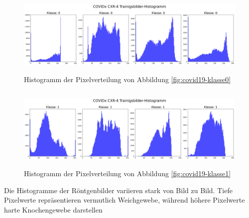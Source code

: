 \begin{figure}[ht]
    \centering
    \includegraphics[width=\linewidth, height=4cm]{01-images/03-data/covid19-klasse0-hist.png}
    \caption{Histogramm der Pixelverteilung von Abbildung \ref{fig:covid19-klasse0}}
    \label{fig:covid19-klasse0-hist}
\end{figure}

\begin{figure}[ht]
    \centering
    \includegraphics[width=\linewidth, height=4cm]{01-images/03-data/covid19-klasse1-hist.png}
    \caption{Histogramm der Pixelverteilung von Abbildung \ref{fig:covid19-klasse1}}
    \label{fig:covid19-klasse1-hist}
\end{figure}

Die Histogramme der Röntgenbilder variieren stark von Bild zu Bild. Tiefe Pixelwerte repräsentieren vermutlich Weichgewebe, während höhere Pixelwerte harte Knochengewebe darstellen

\newpage